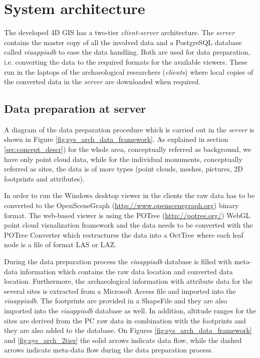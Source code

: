 \section{System architecture}
\label{sec:sys_arch}

The developed 4D GIS has a two-tier {\em client-server} architecture. The {\em server} contains the master copy of all the involved data and a PostgreSQL database called \textit{viaappiadb} to ease the data handling. Both are used for data preparation, i.e. converting the data to the required formats for the available viewers. These run in the laptops of the archaeological researchers ({\em clients}) where local copies of the converted data in the {\em server} are downloaded when required.

\subsection{Data preparation at server}

A diagram of the data preparation procedure which is carried out in the {\em server} is shown in Figure \ref{fig:sys_arch_data_framework}. As explained in section \ref{sec:concept_descr}) for the whole area, conceptually referred as background, we have only point cloud data, while for the individual monuments, conceptually referred as sites, the data is of more types (point clouds, meshes, pictures, 2D footprints and attributes). 

In order to run the Windows desktop viewer in the clients the raw data has to be converted to the OpenSceneGraph
(\url{http://www.openscenegraph.org}) binary format. The web-based viewer is using the POTree (\url{http://potree.org/}) WebGL point
cloud visualization framework and the data needs to be converted with the POTree Converter which restructures the data into a OctTree where each leaf node is a file of format LAS or LAZ. 

During the data preparation process the \textit{viaappiadb} database is filled with
meta-data information which contains the raw data location and converted data location.
Furthermore, the archaeological information with attribute data for the several sites
is extracted from a Microsoft Access file and imported into the \textit{viaappiadb}. The footprints are provided in a ShapeFile and they are also imported into the \textit{viaappiadb} database as well. In addition, altitude
ranges for the sites are derived from the PC raw data in combination with the footprints and they are also added
to the database. On Figures \ref{fig:sys_arch_data_framework} and \ref{fig:sys_arch_2tier}
the solid arrows indicate data flow, while the dashed arrows indicate meta-data flow
during the data preparation process.

